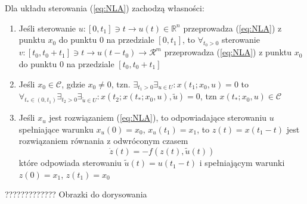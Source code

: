 \begin{lemma}{}{}
    Dla układu sterowania (\ref{eq:NLA}) zachodzą własności: \begin{enumerate}
        \item Jeśli sterowanie $u \colon [0, t_1] \ni t \to u(t) \in \mathbb{R}^n$ przeprowadza (\ref{eq:NLA}) z punktu $x_0$ do punktu 0 na przedziale $[0, t_1]$, to $\forall_{t_0 > 0}$ sterowanie $v \colon [t_0, t_0 + t_1] \ni t \to u (t - t_0) \to \mathcal{R}^m$ przeprowadza (\ref{eq:NLA}) z punktu $x_0$ do punktu 0 na przedziale $[t_0, t_0 + t_1]$
        \item Jeśli $x_0 \in \mathscr{C}$, gdzie $x_0 \neq 0$, tzn. $\exists_{t_1 > 0} \exists_{u \in U} \colon x(t_1; x_0, u) = 0$ to $\forall_{t_* \in (0, t_1)} \exists_{t_2 > 0} \exists_{\tilde{u} \in U} \colon x(t_2; x(t_*; x_0, u), \tilde{u}) = 0$, tzn $x(t_*; x_0, u) \in \mathscr{C}$
        \item Jeśli $x_u$ jest rozwiązaniem (\ref{eq:NLA}), to odpowiadające sterowaniu $u$ spełniające warunku $x_u(0) = x_0$, $x_u(t_1) = x_1$, to $z(t) = x(t_1 - t)$ jest rozwiązaniem równania z odwróconym czasem \begin{equation}
            \dot{z}(t) = -f(z(t), \tilde{u}(t))
        \end{equation}
            które odpowiada sterowaniu $\tilde{u}(t) = u(t_1 - t)$ i spełniającym warunki $z(0) = x_1$, $z(t_1) = x_0$
    \end{enumerate}
    ????????????? Obrazki do dorysowania


\end{lemma}
